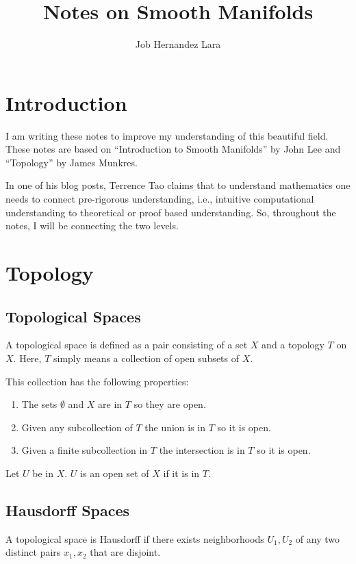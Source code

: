 \documentclass{article}
\title{Notes on Smooth Manifolds}
\author{Job Hernandez Lara}
\date{}
\begin{document}
\maketitle
\tableofcontents

\section{Introduction}
I am writing these notes to improve my understanding of this beautiful field.
These notes are based on ``Introduction to Smooth Manifolds'' by John Lee and ``Topology'' by James Munkres.

In one of his blog posts, Terrence Tao claims that to understand mathematics one needs to connect pre-rigorous understanding, i.e., intuitive computational understanding to theoretical or proof based understanding. So, throughout the notes, I will be connecting the two levels.

\section{Topology}

\subsection{Topological Spaces}

A topological space is defined as a pair consisting of a set $ X $ and a topology $ T $ on $ X $. Here, $ T $ simply means a collection of open subsets of $ X $.

This collection has the following properties:

\begin{enumerate}
\item The sets $ \emptyset $ and $ X $ are in $ T $ so they are open.
\item Given any subcollection of $ T $ the union is in $ T $ so it is open.
\item Given a finite subcollection in $ T $ the intersection is in $ T $ so it is open.
\end{enumerate}

Let $ U $ be in $ X $. $ U $ is an open set of $ X $ if it is in $ T $.
\subsection{Hausdorff Spaces}
A topological space is Hausdorff if there exists neighborhoods $ U_{1}, U_{2} $ of any two distinct pairs $ x_{1}, x_{2} $ that are disjoint.
\end{document}
